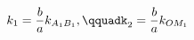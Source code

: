 \documentclass[preview]{standalone}
\begin{document}
\begin{align*}
\special{dvisvgm:raw <g id='unique000'>}k_1=\frac{b}{a}k_{A_1B_1},\qquadk_2=\frac{b}{a}k_{OM_1}\special{dvisvgm:raw </g>}
\end{align*}
\end{document}
